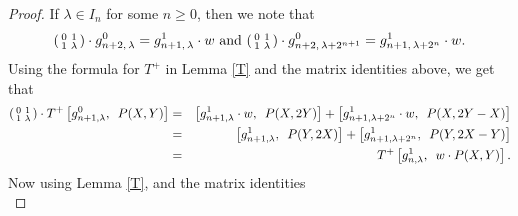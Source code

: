 \documentclass[11pt, reqno]{amsart}
\numberwithin{equation}{section}
\theoremstyle{definition}
\theoremstyle{remark}
\theoremstyle{definition}
\theoremstyle{remark}
\theoremstyle{remark}
\begin{document}
\begin{proof}
If $\lambda\in I_{n}$ for some $n\geq 0$, then we note that
\begin{equation}\label{matrixrel}
     \begin{psmallmatrix}
    0 & 1\\
    1 & \lambda
    \end{psmallmatrix}\cdot g_{n+2,\,\lambda}^{0}= g_{n+1,\,\lambda}^{1}\cdot w \text{ and } 
    \begin{psmallmatrix}
    0 & 1\\
    1 & \lambda
    \end{psmallmatrix}\cdot g_{n+2,\, \lambda + 2^{n+1}}^{0} = g_{n+1,\,\lambda+2^n}^{1}\cdot w .
    \end{equation}
    Using the formula for $T^+$ in Lemma \ref{T} and the matrix identities above, we get that
    \begin{eqnarray*}
     \begin{psmallmatrix}
    0 & 1\\
    1 & \lambda
\end{psmallmatrix}
\cdot T^+\left[g_{n+1,\lambda}^{0},\enspace P(X,Y)\right]&= & \left[g_{n+1,\lambda}^{1}\cdot w, \enspace P(X,2Y)\right] + \left[g_{n+1,\lambda+2^n}^{1}\cdot w,\enspace P(X,2Y-X)\right]\\
    &=& \left[g_{n+1,\lambda}^{1} ,\enspace P(Y,2X)\right] + \left[g_{n+1,\lambda+2^n}^{1},\enspace  P(Y,2X-Y)\right]\\
    &=& T^+\left[g_{n,\lambda}^{1},\enspace w\cdot P(X,Y)\right].   
    \end{eqnarray*}
    Now using Lemma \ref{T}, and  the matrix identities
    \begin{equation} \label{matrixrel2}

\end{equation}
\end{proof}
\end{document}
